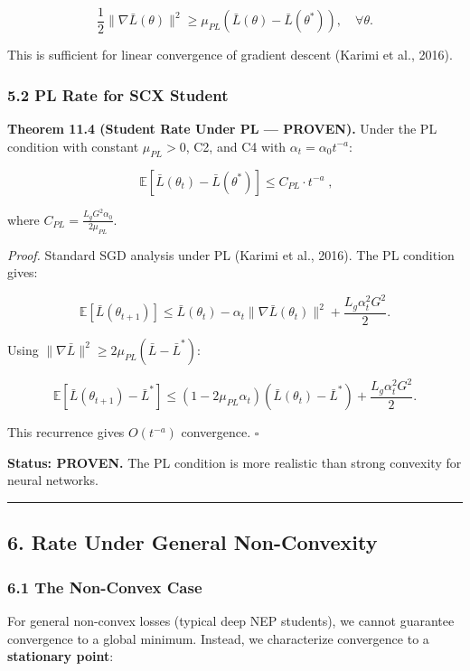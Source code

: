 \documentclass[
  12pt,
]{article}
\begin{document}
\[\frac{1}{2} \|\nabla \bar{L}(\theta)\|^2 \geq \mu_{PL} (\bar{L}(\theta) - \bar{L}(\theta^*)), \quad \forall \theta.\]

This is sufficient for linear convergence of gradient descent (Karimi et
al., 2016).

\subsubsection{5.2 PL Rate for SCX
Student}\label{pl-rate-for-scx-student}

\textbf{Theorem 11.4 (Student Rate Under PL --- PROVEN).} Under the PL
condition with constant \(\mu_{PL} > 0\), C2, and C4 with
\(\alpha_t = \alpha_0 t^{-a}\):

\[\boxed{\;\mathbb{E}[\bar{L}(\theta_t) - \bar{L}(\theta^*)] \leq C_{PL} \cdot t^{-a}\;},\]

where \(C_{PL} = \frac{L_g G^2 \alpha_0}{2\mu_{PL}}\).

\emph{Proof.} Standard SGD analysis under PL (Karimi et al., 2016). The
PL condition gives:

\[\mathbb{E}[\bar{L}(\theta_{t+1})] \leq \bar{L}(\theta_t) - \alpha_t \|\nabla \bar{L}(\theta_t)\|^2 + \frac{L_g \alpha_t^2 G^2}{2}.\]

Using \(\|\nabla \bar{L}\|^2 \geq 2\mu_{PL}(\bar{L} - \bar{L}^*)\):

\[\mathbb{E}[\bar{L}(\theta_{t+1}) - \bar{L}^*] \leq (1 - 2\mu_{PL}\alpha_t)(\bar{L}(\theta_t) - \bar{L}^*) + \frac{L_g \alpha_t^2 G^2}{2}.\]

This recurrence gives \(O(t^{-a})\) convergence. \(\square\)

\textbf{Status: PROVEN.} The PL condition is more realistic than strong
convexity for neural networks.

\begin{center}\rule{0.5\linewidth}{0.5pt}\end{center}

\subsection{6. Rate Under General
Non-Convexity}\label{rate-under-general-non-convexity}

\subsubsection{6.1 The Non-Convex Case}\label{the-non-convex-case}

For general non-convex losses (typical deep NEP students), we cannot
guarantee convergence to a global minimum. Instead, we characterize
convergence to a \textbf{stationary point}:
\end{document}
